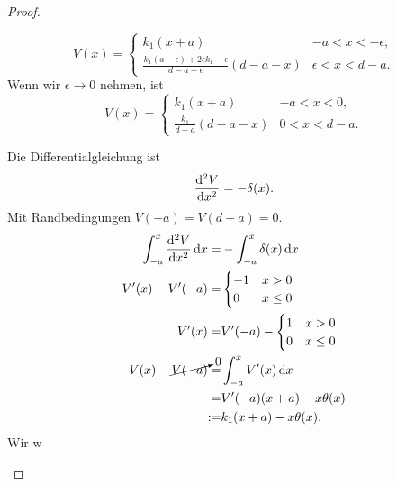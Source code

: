 \begin{proof}
\begin{parts}
\[
V(x)=\begin{cases}
	k_1(x + a) & -a < x < -\epsilon,\\
	\frac{k_1(a-\epsilon)+2\epsilon k_1 - \epsilon}{d-a-\epsilon}(d-a-x) & \epsilon < x < d-a.
\end{cases}
\]
Wenn wir $\epsilon\to 0$ nehmen, ist
\[
V(x) = \begin{cases}
	k_1(x+a) & -a < x < 0, \\
	\frac{k_1}{d-a}(d-a-x) & 0 < x < d-a.
\end{cases}
\] 
\item Die Differentialgleichung ist
	\[
		\dv[2]{V}{x}=-\delta(x)
	.\] 
Mit Randbedingungen $V(-a)=V(d-a)=0$.
\begin{align*}
	\int_{-a}^x \dv[2]{V}{x}\dd{x}=&-\int_{-a}^x \delta(x)\dd{x}\\
	V'(x)-V'(-a)=&\begin{cases}
		-1 & x > 0\\
		0 & x\le 0
	\end{cases}\\
		V'(x)=&V'(-a)-\begin{cases}
			1 & x > 0\\
			0 & x \le 0
		\end{cases}\\
			V(x) - \cancelto{0}{V(-a)} =& \int_{-a}^x V'(x) \dd{x}\\
			=& V'(-a)(x+a) - x\theta(x)\\
			:=& k_1(x+a)-x\theta(x).
\end{align*}
Wir w
	\end{parts}
\end{proof}
